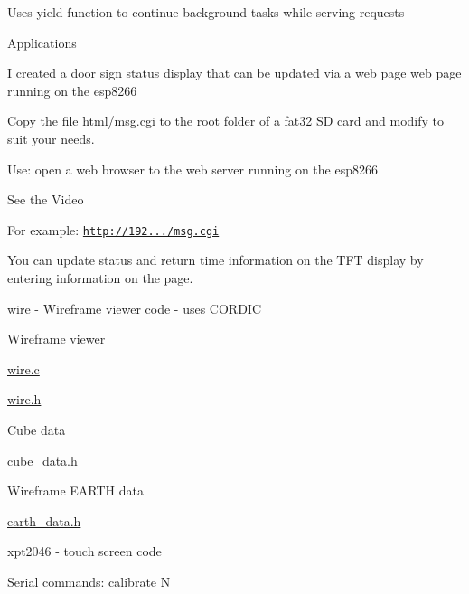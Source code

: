 \begin{DoxyItemize}
\begin{DoxyItemize}
\begin{DoxyItemize}
\end{DoxyItemize}
\item Uses yield function to continue background tasks while serving requests
\item Applications
\begin{DoxyItemize}
\item I created a door sign status display that can be updated via a web page web page running on the esp8266
\item Copy the file html/msg.\+cgi to the root folder of a fat32 SD card and modify to suit your needs.
\item Use\+: open a web browser to the web server running on the esp8266
\begin{DoxyItemize}
\item See the Video
\item For example\+: \href{http://192.168.200.116/msg.cgi}{\tt http\+://192.../msg.\+cgi}
\item You can update status and return time information on the T\+FT display by entering information on the page.
\end{DoxyItemize}
\end{DoxyItemize}
\end{DoxyItemize}
\item wire -\/ Wireframe viewer code -\/ uses C\+O\+R\+D\+IC
\begin{DoxyItemize}
\item Wireframe viewer
\begin{DoxyItemize}
\item \hyperlink{wire_8c}{wire.\+c}
\item \hyperlink{wire_8h}{wire.\+h}
\end{DoxyItemize}
\item Cube data
\begin{DoxyItemize}
\item \hyperlink{cube__data_8h}{cube\+\_\+data.\+h}
\end{DoxyItemize}
\item Wireframe E\+A\+R\+TH data
\begin{DoxyItemize}
\item \hyperlink{earth__data_8h}{earth\+\_\+data.\+h}
\end{DoxyItemize}
\end{DoxyItemize}
\item xpt2046 -\/ touch screen code
\begin{DoxyItemize}
\item Serial commands\+: calibrate N

\end{DoxyItemize}
\end{DoxyItemize}
